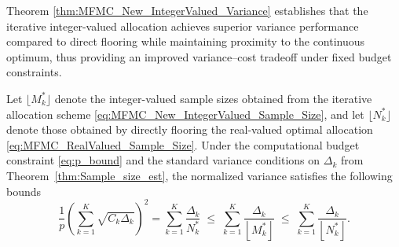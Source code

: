 Theorem \ref{thm:MFMC_New_IntegerValued_Variance} establishes that the iterative integer-valued allocation achieves superior variance performance compared to direct flooring while maintaining proximity to the continuous optimum, thus providing an improved variance--cost tradeoff under fixed budget constraints.
%
\begin{theorem}
\label{thm:MFMC_New_IntegerValued_Variance}
Let $\lfloor M_k^* \rfloor$ denote the integer-valued sample sizes obtained from the iterative allocation scheme \eqref{eq:MFMC_New_IntegerValued_Sample_Size}, and let $\lfloor N_k^* \rfloor$ denote those obtained by directly flooring the real-valued optimal allocation \eqref{eq:MFMC_RealValued_Sample_Size}. Under the computational budget constraint \eqref{eq:p_bound} and the standard variance conditions on $\Delta_k$ from Theorem~\ref{thm:Sample_size_est}, the normalized variance satisfies the following bounds
%
\begin{equation}\label{eq:Iterative_Integer_Variance_Bound}
\frac{1}{p}\left(\sum_{k=1}^K \sqrt{C_k \Delta_k}\right)^2
= \sum_{k=1}^K \frac{\Delta_k}{N_k^*}
\;\le\;
\sum_{k=1}^K \frac{\Delta_k}{\left\lfloor M_k^* \right\rfloor}
\;\le\;
\sum_{k=1}^K \frac{\Delta_k}{\left\lfloor N_k^* \right\rfloor}.
\end{equation}
%
\end{theorem}
%




